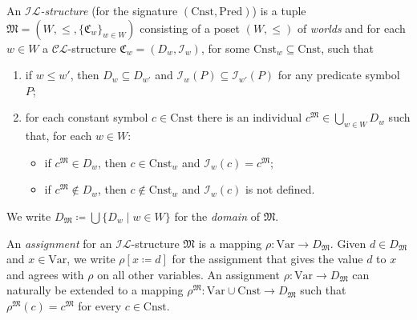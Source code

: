 \documentclass[submission,copyright,creativecommons]{eptcs}
\newcommand{\mo}{\mathfrak}
\newcommand{\Var}{\mathrm{Var}}
\newcommand{\Con}{\mathrm{Cnst}}
\newcommand{\Pred}{\mathrm{Pred}}
\newcommand{\II}{\mathscr{I}}
\newcommand{\IL}{\mathscr{I\!\!L}}   %
\newcommand{\CL}{\mathscr{C\!\!L}}   %
\begin{document}
\begin{definition}\label{def:IL-structure}
  An \emph{$\IL$-structure} (for the signature $(\Con,\Pred)$) is a tuple $\mo{M} = (W, \leq, \{ \mo{C}_w \}_{w \in W})$
  consisting of a poset $(W, \leq)$ of \emph{worlds} and for each $w \in W$ a
  $\CL$-structure $\mo{C}_w = (D_w, \II_w)$,
  for some $\Con_w \subseteq \Con$, such that
  \begin{enumerate}
    \item if $w \leq w'$, then $D_w \subseteq D_{w'}$ and
          $\II_w(P) \subseteq \II_{w'}(P)$ for any predicate symbol $P$;
    \item for each constant symbol $c \in \Con$ there is an individual
          $c^{\mo{M}} \in \bigcup_{w \in W} D_w$ such that, for each $w\in W$:
          \begin{itemize}\itemsep0pt
            \item if $c^{\mo{M}} \in D_w$, then $c \in \Con_w$ and $\II_w(c) = c^{\mo{M}}$;
            \item if $c^{\mo{M}} \notin D_w$, then $c \notin \Con_w$ and $\II_w(c)$ is not defined.
          \end{itemize}
  \end{enumerate}
  We write $D_{\mo{M}} \coloneq \bigcup \{ D_w \mid w \in W \}$ for the \emph{domain} of $\mo{M}$.

  An \emph{assignment} for an $\IL$-structure $\mo{M}$ is a mapping
  $\rho : \Var\to D_{\mo{M}}$. Given $d \in D_{\mo{M}}$ and $x\in\Var$, we write $\rho[x \coloneq d]$ for the assignment that gives the value $d$ to $x$ and agrees with $\rho$ on all other variables.
  An assignment $\rho: \Var \to D_{\mo{M}}$ can naturally be extended to a mapping $\rho^\mo{M}: \Var \cup \Con \to D_{\mo{M}}$ such that $\rho^\mo{M}(c)=c^\mo{M}$ for every $c \in \Con$.


\end{definition}
\end{document}
